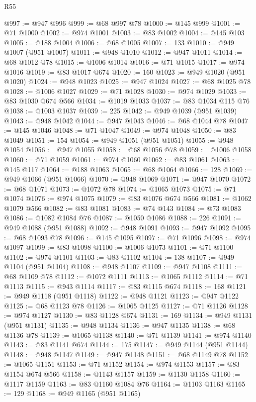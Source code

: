 \begin{lexlean}{R55}
\begin{coremodule}
{{{{{{{{{{{{{{{{{{{{{{{{{{{{{{{{{{{{{{{{{{{{{{{{{{{{{{{{{{{{{{@997 := @947 @996
@999 := @68 @997 @78
@1000 := @145 @999
@1001 := @71 @1000
@1002 := @974 @1001
@1003 := @83 @1002
@1004 := @145 @103
@1005 := @188 @1004
@1006 := @68 @1005
@1007 := 133
@1010 := @949 @1007 (@951 @1007)
@1011 := @948 @1010
@1012 := @947 @1011
@1014 := @68 @1012 @78
@1015 := @1006 @1014
@1016 := @71 @1015
@1017 := @974 @1016
@1019 := @83 @1017 @674
@1020 := 160
@1023 := @949 @1020 (@951 @1020)
@1024 := @948 @1023
@1025 := @947 @1024
@1027 := @68 @1025 @78
@1028 := @1006 @1027
@1029 := @71 @1028
@1030 := @974 @1029
@1033 := @83 @1030 @674 @566
@1034 := @1019 @1033
@1037 := @83 @1034 @115 @76
@1038 := @1003 @1037
@1039 := 225
@1042 := @949 @1039 (@951 @1039)
@1043 := @948 @1042
@1044 := @947 @1043
@1046 := @68 @1044 @78
@1047 := @145 @1046
@1048 := @71 @1047
@1049 := @974 @1048
@1050 := @83 @1049
@1051 := 154
@1054 := @949 @1051 (@951 @1051)
@1055 := @948 @1054
@1056 := @947 @1055
@1058 := @68 @1056 @78
@1059 := @1006 @1058
@1060 := @71 @1059
@1061 := @974 @1060
@1062 := @83 @1061
@1063 := @145 @117
@1064 := @188 @1063
@1065 := @68 @1064
@1066 := 128
@1069 := @949 @1066 (@951 @1066)
@1070 := @948 @1069
@1071 := @947 @1070
@1072 := @68 @1071
@1073 := @1072 @78
@1074 := @1065 @1073
@1075 := @71 @1074
@1076 := @974 @1075
@1079 := @83 @1076 @674 @566
@1081 := @1062 @1079 @566
@1082 := @83 @1081
@1083 := @74 @143
@1084 := @73 @1083
@1086 := @1082 @1084 @76
@1087 := @1050 @1086
@1088 := 226
@1091 := @949 @1088 (@951 @1088)
@1092 := @948 @1091
@1093 := @947 @1092
@1095 := @68 @1093 @78
@1096 := @145 @1095
@1097 := @71 @1096
@1098 := @974 @1097
@1099 := @83 @1098
@1100 := @1006 @1073
@1101 := @71 @1100
@1102 := @974 @1101
@1103 := @83 @1102
@1104 := 138
@1107 := @949 @1104 (@951 @1104)
@1108 := @948 @1107
@1109 := @947 @1108
@1111 := @68 @1109 @78
@1112 := @1072 @1111
@1113 := @1065 @1112
@1114 := @71 @1113
@1115 := @943 @1114
@1117 := @83 @1115 @674
@1118 := 168
@1121 := @949 @1118 (@951 @1118)
@1122 := @948 @1121
@1123 := @947 @1122
@1125 := @68 @1123 @78
@1126 := @1065 @1125
@1127 := @71 @1126
@1128 := @974 @1127
@1130 := @83 @1128 @674
@1131 := 169
@1134 := @949 @1131 (@951 @1131)
@1135 := @948 @1134
@1136 := @947 @1135
@1138 := @68 @1136 @78
@1139 := @1065 @1138
@1140 := @71 @1139
@1141 := @974 @1140
@1143 := @83 @1141 @674
@1144 := 175
@1147 := @949 @1144 (@951 @1144)
@1148 := @948 @1147
@1149 := @947 @1148
@1151 := @68 @1149 @78
@1152 := @1065 @1151
@1153 := @71 @1152
@1154 := @974 @1153
@1157 := @83 @1154 @674 @566
@1158 := @1143 @1157
@1159 := @1130 @1158
@1160 := @1117 @1159
@1163 := @83 @1160 @1084 @76
@1164 := @1103 @1163
@1165 := 129
@1168 := @949 @1165 (@951 @1165)
}}}}}}}}}}}}}}}}}}}}}}}}}}}}}}}}}}}}}}}}}}}}}}}}}}}}}}}}}}}}}}
\end{coremodule}
\end{lexlean}
